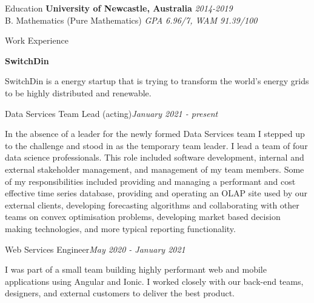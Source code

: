 \documentclass{resume} %
\begin{document}

\begin{rSection}{Education}
    {\bf University of Newcastle, Australia} \hfill {\em 2014-2019}
    \\ B. Mathematics (Pure Mathematics) \hfill {\em GPA 6.96/7, WAM 91.39/100}
\end{rSection}




\begin{rSection}{Work Experience}

{\bf SwitchDin}

SwitchDin is a energy startup that is trying to transform the world's energy grids to be highly
distributed and renewable.

\begin{adjustwidth}{2em}{}
    \begin{rSubsection}{Data Services Team Lead (acting)}{\em January 2021 - present}{}{}
    \item In the absence of a leader for the newly formed Data Services team I stepped up to the
    challenge and stood in as the temporary team leader. I lead a team of four data science
    professionals. This role included software development, internal and external stakeholder
    management, and management of my team members. Some of my responsibilities included providing
    and managing a performant and cost effective time series database, providing and operating an
    OLAP site used by our external clients, developing forecasting algorithms and collaborating
    with other teams on convex optimisation problems, developing market based decision making
    technologies, and more typical reporting functionality.
    \end{rSubsection}

    \begin{rSubsection}{Web Services Engineer}{\em May 2020 - January 2021}{}{}
    \item I was part of a small team building highly performant web and mobile applications using
    Angular and Ionic. I worked closely with our back-end teams, designers, and external customers
    to deliver the best product.
    \end{rSubsection}
\end{adjustwidth}


\end{rSection}
\end{document}
